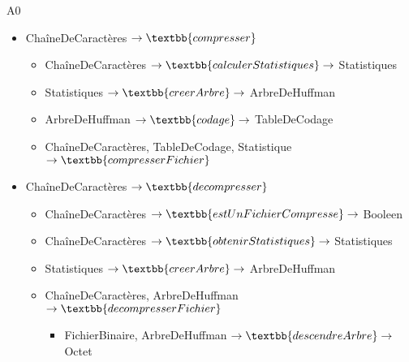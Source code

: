 A0 
\begin{itemize}
	\item ChaîneDeCaractères $\rightarrow\textbb{compresser}$
    \begin{itemize}
		\item ChaîneDeCaractères $\rightarrow\textbb{calculerStatistiques}\rightarrow$ Statistiques
		\item Statistiques $\rightarrow\textbb{creerArbre}\rightarrow$ ArbreDeHuffman
		\item ArbreDeHuffman $\rightarrow\textbb{codage}\rightarrow$ TableDeCodage
		\item ChaîneDeCaractères, TableDeCodage, Statistique $\rightarrow\textbb{compresserFichier}$
    \end{itemize}
	\item ChaîneDeCaractères $\rightarrow\textbb{decompresser}$ 
    \begin{itemize}
        \item ChaîneDeCaractères $\rightarrow\textbb{estUnFichierCompresse}\rightarrow$ Booleen
		\item ChaîneDeCaractères $\rightarrow\textbb{obtenirStatistiques}\rightarrow$ Statistiques
		\item Statistiques $\rightarrow\textbb{creerArbre}\rightarrow$ ArbreDeHuffman
		\item ChaîneDeCaractères, ArbreDeHuffman $\rightarrow\textbb{decompresserFichier}$
        \begin{itemize}
            \item FichierBinaire, ArbreDeHuffman $\rightarrow\textbb{descendreArbre}\rightarrow$ Octet
        \end{itemize}
    \end{itemize}
\end{itemize}  
